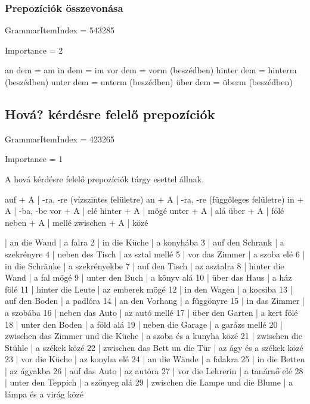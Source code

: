 \documentclass{article}
\newenvironment{desc}{\verbatim}{\endverbatim}
\newenvironment{exmp}{\verbatim}{\endverbatim}
\begin{document}
\subsubsection{Prepozíciók összevonása}

GrammarItemIndex = 543285

Importance = 2

\begin{desc}
an dem = am
in dem = im
vor dem = vorm (beszédben)
hinter dem = hinterm (beszédben)
unter dem = unterm (beszédben)
über dem = überm (beszédben)
\end{desc}

\subsection{Hová? kérdésre felelő prepozíciók}

GrammarItemIndex = 423265

Importance = 1

\begin{desc}
A hová kérdésre felelő prepozíciók tárgy esettel állnak.

auf + A      | -ra, -re (vízszintes felületre)
an + A       | -ra, -re (függőleges felületre)
in + A       | -ba, -be
vor + A      | elé
hinter + A   | mögé
unter + A    | alá
über + A     | fölé
neben + A    | mellé
zwischen + A | közé
\end{desc}

\begin{exmp}
1 | an die Wand | a falra
2 | in die Küche | a konyhába
3 | auf den Schrank | a szekrényre
4 | neben des Tisch | az sztal mellé
5 | vor das Zimmer | a szoba elé
6 | in die Schränke | a szekrényekbe
7 | auf den Tisch | az asztalra
8 | hinter die Wand | a fal mögé
9 | unter den Buch | a könyv alá
10 | über das Haus | a ház fölé
11 | hinter die Leute | az emberek mögé
12 | in den Wagen | a kocsiba
13 | auf den Boden | a padlóra
14 | an den Vorhang | a függönyre
15 | in das Zimmer | a szobába
16 | neben das Auto | az autó mellé
17 | über den Garten | a kert fölé
18 | unter den Boden | a föld alá
19 | neben die Garage | a garázs mellé
20 | zwischen das Zimmer und die Küche | a szoba és a kunyha közé
21 | zwischen die Stühle | a székek közé
22 | zwischen das Bett un die Tür | az ágy és a székek közé
23 | vor die Küche | az konyha elé
24 | an die Wände | a falakra
25 | in die Betten | az ágyakba
26 | auf das Auto | az autóra
27 | vor die Lehrerin | a tanárnő elé
28 | unter den Teppich | a szőnyeg alá
29 | zwischen die Lampe und die Blume | a lámpa és a virág közé
\end{exmp}
\end{document}
